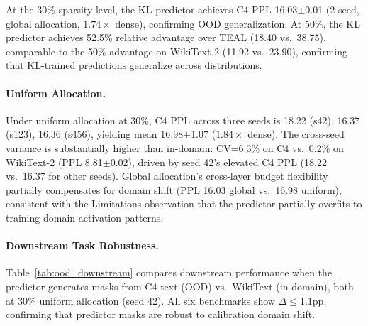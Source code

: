 At the 30\% sparsity level, the KL predictor achieves C4 PPL 16.03$\pm$0.01 (2-seed, global allocation, $1.74\times$ dense), confirming OOD generalization.
At 50\%, the KL predictor achieves 52.5\% relative advantage over TEAL (18.40 vs.\ 38.75), comparable to the 50\% advantage on WikiText-2 (11.92 vs.\ 23.90), confirming that KL-trained predictions generalize across distributions.

\paragraph{Uniform Allocation.}
Under uniform allocation at 30\%, C4 PPL across three seeds is 18.22 (s42), 16.37 (s123), 16.36 (s456), yielding mean 16.98$\pm$1.07 ($1.84\times$ dense).
The cross-seed variance is substantially higher than in-domain: CV=6.3\% on C4 vs.\ 0.2\% on WikiText-2 (PPL 8.81$\pm$0.02), driven by seed 42's elevated C4 PPL (18.22 vs.\ 16.37 for other seeds).
Global allocation's cross-layer budget flexibility partially compensates for domain shift (PPL 16.03 global vs.\ 16.98 uniform), consistent with the Limitations observation that the predictor partially overfits to training-domain activation patterns.

\paragraph{Downstream Task Robustness.}
Table~\ref{tab:ood_downstream} compares downstream performance when the predictor generates masks from C4 text (OOD) vs.\ WikiText (in-domain), both at 30\% uniform allocation (seed 42). All six benchmarks show $\Delta$$\leq$1.1pp, confirming that predictor masks are robust to calibration domain shift.

\begin{table}[h]
\centering
\caption{Downstream task robustness to calibration domain shift (KL 30\% uniform, seed 42). WikiText: predictor masks from in-domain text; C4: masks from OOD text. Metrics: acc\_norm (ARC-c, HS, PIQA), acc (WG, MMLU), exact\_match (GSM8K).}
\label{tab:ood_downstream}
\end{table}


